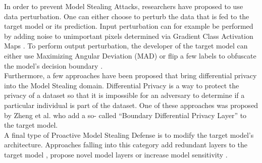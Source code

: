 In order to prevent Model Stealing Attacks, researchers have proposed to use data perturbation. One can either choose to perturb the data that is fed to the target model or its prediction.
Input perturbation can for example be performed by adding noise to unimportant pixels determined via Gradient Class Activation Maps \cite{guiga2020neural}. To perform output perturbation,
the developer of the target model can either use Maximizing Angular Deviation (MAD) \cite{orekondy2019prediction} or flip a few labels to obfuscate the model's decision boundary
\cite{shi2017evasion}. \\
Furthermore, a few approaches have been proposed that bring differential privacy into the Model Stealing domain. Differential Privacy is a way to protect the privacy of a dataset so that 
it is impossible for an adversary to determine if a particular individual is part of the dataset. One of these approaches was proposed by Zheng et al. \cite{zheng2019bdpl} who add a so-
called \enquote{Boundary Differential Privacy Layer} to the target model. \\
A final type of Proactive Model Stealing Defense is to modify the target model's architecture. Approaches falling into this category add redundant layers to the target model 
\cite{chabanne2020protection}, propose novel model layers \cite{xu2018deepobfuscation} or increase model sensitivity \cite{szentannai2020preventing}.
